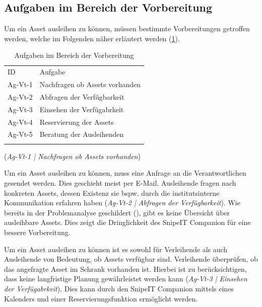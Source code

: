 \subsection{Aufgaben im Bereich der Vorbereitung}
Um ein Asset ausleihen zu können, müssen bestimmte Vorbereitungen getroffen werden, welche im
Folgenden näher erläutert werden (\ref{table:Ag-Vt}).

\begin{table}[h]
        \centering
        \caption{Aufgaben im Bereich der Vorbereitung}
        \begin{tabular}{ll}
                \arrayrulecolor{maincolor}\hline
                \sffamily\color{maincolor}ID & \sffamily\color{maincolor}Aufgabe \\
                \arrayrulecolor{maincolor}\hline
                Ag-Vt-1                      & Nachfragen ob Assets vorhanden \\
                Ag-Vt-2                      & Abfragen der Verfügbarkeit \\
                Ag-Vt-3                      & Einsehen der Verfügabrkeit \\
                Ag-Vt-4                      & Reservierung der Assets \\
                Ag-Vt-5                      & Beratung der Ausleihenden \\
                \arrayrulecolor{maincolor}\hline
        \end{tabular}
        \label{table:Ag-Vt}
\end{table}
(\textit{Ag-Vt-1 |  Nachfragen ob Assets vorhanden}) 

Um ein Asset ausleihen zu können, muss eine Anfrage an die Verantwortlichen gesendet werden. Dies
geschieht meist per E-Mail. Ausleihende fragen nach konkreten Assets, dessen Existenz sie bspw.
durch die institutsinterne Kommunikation erfahren haben (\textit{Ag-Vt-2 | Abfragen der
Verfügbarkeit}). Wie bereits in der Problemanalyse geschildert
(), gibt es keine Übersicht über ausleihbare Assets. Dies zeigt
die Dringlichkeit des SnipeIT Companion für eine bessere Vorbereitung.

Um ein Asset ausleihen zu können ist es sowohl für Verleihende als auch Ausleihende von Bedeutung,
ob Assets verfügbar sind. Verleihende überprüfen, ob das angefragte Asset im Schrank vorhanden ist.
Hierbei ist zu berücksichtigen, dass keine langfristige Planung gewährleistet werden kann
(\textit{Ag-Vt-3 | Einsehen der Verfügabrkeit}). Dies kann durch den SnipeIT Companion mittels eines
Kalenders und einer Reservierungsfunktion ermöglicht werden.


